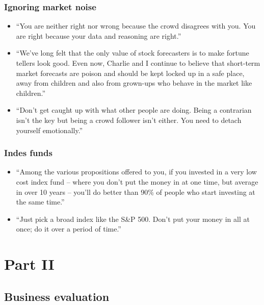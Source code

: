 \documentclass[
]{book}
\begin{document}
\hypertarget{ignoring-market-noise}{%
\section{Ignoring market noise}\label{ignoring-market-noise}}

\begin{itemize}
\item
  ``You are neither right nor wrong because the crowd disagrees with you. You are right because your data and reasoning are right.''
\item
  ``We've long felt that the only value of stock forecasters is to make fortune tellers look good. Even now, Charlie and I continue to believe that short-term market forecasts are poison and should be kept locked up in a safe place, away from children and also from grown-ups who behave in the market like children.''
\item
  ``Don't get caught up with what other people are doing. Being a contrarian isn't the key but being a crowd follower isn't either. You need to detach yourself emotionally.''
\end{itemize}

\hypertarget{indes-funds}{%
\section{Indes funds}\label{indes-funds}}

\begin{itemize}
\item
  ``Among the various propositions offered to you, if you invested in a very low cost index fund -- where you don't put the money in at one time, but average in over 10 years -- you'll do better than 90\% of people who start investing at the same time.''
\item
  ``Just pick a broad index like the S\&P 500. Don't put your money in all at once; do it over a period of time.''
\end{itemize}

\hypertarget{part-part-ii}{%
\part{Part II}\label{part-part-ii}}

\hypertarget{business}{%
\chapter{Business evaluation}\label{business}}
\end{document}
